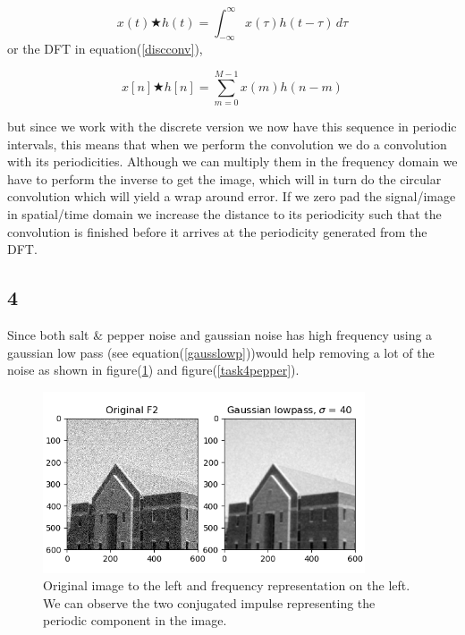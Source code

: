 {\begin{equation}
    x(t) \bigstar h(t) = \int_{-\infty}^{\infty} x(\tau)h(t - \tau)\, d\tau
    \label{contconv}
\end{equation}
or the DFT in equation(\ref{discconv}),

\begin{equation}
    x[n] \bigstar h[n] = \sum_{m = 0}^{M-1} x(m)h(n - m)
    \label{discconv}
\end{equation}

but since we work with the discrete version we now have this sequence in periodic intervals, this means that when we perform the convolution we do a convolution with its periodicities. Although we can multiply them in the frequency domain we have to perform the inverse to get the image, which will in turn do the circular convolution which will yield a wrap around error. If we zero pad the signal/image in spatial/time domain we increase the distance to its periodicity such that the convolution is finished before it arrives at the periodicity generated from the DFT.


\subsection{4}

Since both salt \& pepper noise and gaussian noise has high frequency using a gaussian low pass (see equation(\ref{gausslowp}))would help removing a lot of the noise as shown in figure(\ref{task4gauss}) and figure(\ref{task4pepper}).

\begin{figure}[!htb]
    {\centering
        \includegraphics[width=0.85\textwidth]{task4gauss.png}
        \caption{Original image to the left and frequency representation on the left. We can observe the two conjugated impulse representing the periodic component in the image.}
        \label{task4gauss}
    \par}
    \end{figure}

}
